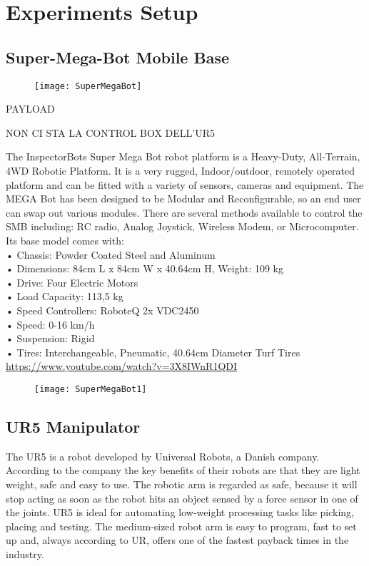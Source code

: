 \chapter{Experiments Setup}
\label{chapter6}

\section{Super-Mega-Bot Mobile Base}
\begin{figure}[h]
	\begin{center} 
		\texttt{[image: SuperMegaBot]}
		\centering
		\label{fig:SuperMegaBot} 
	\end{center}
\end{figure}
PAYLOAD

NON CI STA LA CONTROL BOX DELL'UR5


The InspectorBots Super Mega Bot robot platform is a Heavy-Duty, All-Terrain, 4WD Robotic Platform. It is a very rugged, Indoor/outdoor, remotely operated platform and can be fitted with a variety of sensors, cameras and equipment. The MEGA Bot has been designed to be Modular and Reconfigurable, so an end user can swap out various modules. There are several methods available to control the SMB including: RC radio, Analog Joystick, Wireless Modem, or Microcomputer.\\
Its base model comes with:\\
•	Chassis: Powder Coated Steel and Aluminum \\
•	Dimensions: 84cm L x 84cm W x 40.64cm H, Weight: 109 kg\\
•	Drive: Four Electric Motors\\
•	Load Capacity: 113,5 kg\\
•	Speed Controllers: RoboteQ 2x VDC2450\\
•	Speed: 0-16 km/h \\
•	Suspension: Rigid\\
•	Tires: Interchangeable, Pneumatic, 40.64cm Diameter Turf Tires\\
\url{https://www.youtube.com/watch?v=3X8IWnR1QDI}
\begin{figure}[h]
	\begin{center} 
		\texttt{[image: SuperMegaBot1]}
		\centering
		\label{fig:SuperMegaBot1}
	\end{center}
\end{figure}

\section{UR5 Manipulator}
The UR5 is a robot developed by Universal Robots, a Danish company. According to the company the key benefits of their robots are that they are light weight, safe and easy to use. The robotic arm is regarded as safe, because it will stop acting as soon as the robot hits an object sensed by a force sensor in one of the joints. UR5 is ideal for automating low-weight processing tasks like picking, placing and testing. The medium-sized robot arm is easy to program, fast to set up and, always according to UR, offers one of the fastest payback times in the industry.

